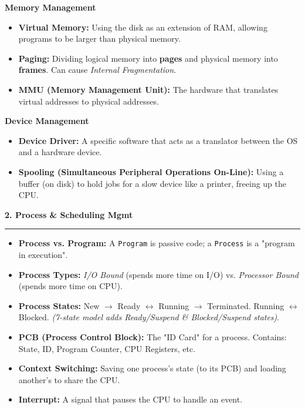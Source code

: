 \documentclass[a4paper, 8pt]{extarticle}
\newcommand{\sectionheading}[1]{\large\textbf{#1}\par\noindent\rule{\linewidth}{0.4pt}}
\newcommand{\subsectionheading}[1]{\normalsize\textbf{#1}}
\begin{document}
\begin{multicols}{2}
\subsectionheading{Memory Management}
\begin{itemize}
    \item \textbf{Virtual Memory:} Using the disk as an extension of RAM, allowing programs to be larger than physical memory.
    \item \textbf{Paging:} Dividing logical memory into \textbf{pages} and physical memory into \textbf{frames}. Can cause \textit{Internal Fragmentation}.
    \item \textbf{MMU (Memory Management Unit):} The hardware that translates virtual addresses to physical addresses.
\end{itemize}

\subsectionheading{Device Management}
\begin{itemize}
    \item \textbf{Device Driver:} A specific software that acts as a translator between the OS and a hardware device.
    \item \textbf{Spooling (Simultaneous Peripheral Operations On-Line):} Using a buffer (on disk) to hold jobs for a slow device like a printer, freeing up the CPU.
\end{itemize}

\columnbreak %


\sectionheading{2. Process \& Scheduling Mgmt}
\vspace{0.5em}
\begin{itemize}
    \item \textbf{Process vs. Program:} A \texttt{Program} is passive code; a \texttt{Process} is a "program in execution".
    \item \textbf{Process Types:} \textit{I/O Bound} (spends more time on I/O) vs. \textit{Processor Bound} (spends more time on CPU).
    \item \textbf{Process States:} New $\rightarrow$ Ready $\leftrightarrow$ Running $\rightarrow$ Terminated. Running $\leftrightarrow$ Blocked. \textit{(7-state model adds Ready/Suspend \& Blocked/Suspend states)}.
    \item \textbf{PCB (Process Control Block):} The "ID Card" for a process. Contains: State, ID, Program Counter, CPU Registers, etc.
    \item \textbf{Context Switching:} Saving one process's state (to its PCB) and loading another's to share the CPU.
    \item \textbf{Interrupt:} A signal that pauses the CPU to handle an event.
\end{itemize}


\end{multicols}
\end{document}
